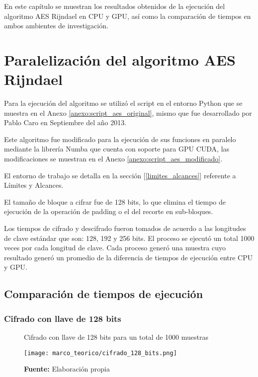 \documentclass[../main/main.tex]{subfiles}
\begin{document}
\espacio
  En este capítulo se muestran los resultados obtenidos de la ejecución del algoritmo AES Rijndael en CPU y GPU, así como la comparación de tiempos en ambos ambientes de investigación.

  \section{Paralelización del algoritmo AES Rijndael}

    Para la ejecución del algoritmo se utilizó el script en el entorno Python que se muestra en el Anexo \ref{anexo:script_aes_original}, mismo que fue desarrollado por Pablo Caro en Septiembre del año 2013.

    Este algoritmo fue modificado para la ejecución de sus funciones en paralelo mediante la librería Numba que cuenta con soporte para GPU CUDA, las modificaciones se muestran en el Anexo \ref{anexo:script_aes_modificado}.

    El entorno de trabajo se detalla en la sección [\ref{limites_alcances}] referente a Límites y Alcances.

    El tamaño de bloque a cifrar fue de 128 bits, lo que elimina el tiempo de ejecución de la operación de padding o el del recorte en sub-bloques.

    Los tiempos de cifrado y descifrado fueron tomados de acuerdo a las longitudes de clave estándar que son: 128, 192 y 256 bits. El proceso se ejecutó un total 1000 veces por cada longitud de clave. Cada proceso generó una muestra cuyo resultado generó un promedio de la diferencia de tiempos de ejecución entre CPU y GPU.

    \subsection{Comparación de tiempos de ejecución}

      \subsubsection{Cifrado con llave de 128 bits}

        \begin{figure}[H]
          \centering
          \caption{Cifrado con llave de 128 bits para un total de 1000 muestras}
          \texttt{[image: marco\_teorico/cifrado\_128\_bits.png]}
          \caption*{\textbf{Fuente:} Elaboración propia}
        \end{figure}
\end{document}
